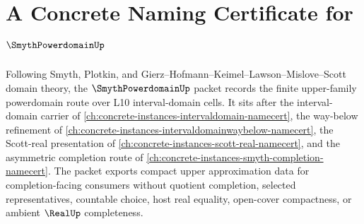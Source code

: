\chapter{A Concrete Naming Certificate for $\SmythPowerdomainUp$}
\label{ch:concrete-instances-smyth-powerdomain-namecert}

Following Smyth, Plotkin, and Gierz--Hofmann--Keimel--Lawson--Mislove--Scott domain theory, the $\SmythPowerdomainUp$ packet records the finite upper-family powerdomain route over L10 interval-domain cells. It sits after the interval-domain carrier of \autoref{ch:concrete-instances-intervaldomain-namecert}, the way-below refinement of \autoref{ch:concrete-instances-intervaldomainwaybelow-namecert}, the Scott-real presentation of \autoref{ch:concrete-instances-scott-real-namecert}, and the asymmetric completion route of \autoref{ch:concrete-instances-smyth-completion-namecert}. The packet exports compact upper approximation data for completion-facing consumers without quotient completion, selected representatives, countable choice, host real equality, open-cover compactness, or ambient $\RealUp$ completeness.

